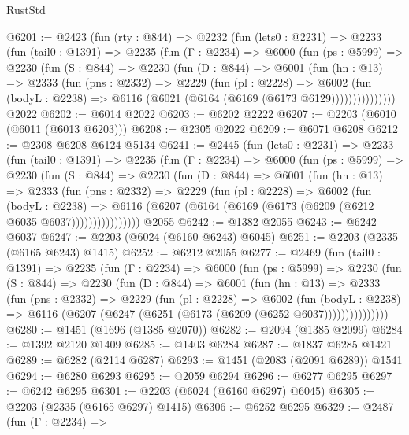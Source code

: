 \begin{lexlean}{RustStd}
\begin{coremodule}
@6201 := @2423
    (fun (rty : @844) =>
    @2232
      (fun (lets0 : @2231) =>
      @2233
        (fun (tail0 : @1391) =>
        @2235
          (fun (Γ : @2234) =>
          @6000
            (fun (ps : @5999) =>
            @2230
              (fun (S : @844) =>
              @2230
                (fun (D : @844) =>
                @6001
                  (fun (hn : @13) =>
                  @2333
                    (fun (pns : @2332) =>
                    @2229
                      (fun (pl : @2228) =>
                      @6002
                        (fun (bodyL : @2238) =>
                        @6116 (@6021 (@6164 (@6169 (@6173 @6129)))))))))))))))
    @2022
@6202 := @6014 @2022
@6203 := @6202 @2222
@6207 := @2203 (@6010 (@6011 (@6013 @6203)))
@6208 := @2305 @2022
@6209 := @6071 @6208
@6212 := @2308 @6208 @6124 @5134
@6241 := @2445
    (fun (lets0 : @2231) =>
    @2233
      (fun (tail0 : @1391) =>
      @2235
        (fun (Γ : @2234) =>
        @6000
          (fun (ps : @5999) =>
          @2230
            (fun (S : @844) =>
            @2230
              (fun (D : @844) =>
              @6001
                (fun (hn : @13) =>
                @2333
                  (fun (pns : @2332) =>
                  @2229
                    (fun (pl : @2228) =>
                    @6002
                      (fun (bodyL : @2238) =>
                      @6116 (@6207 (@6164 (@6169 (@6173 (@6209 (@6212 @6035 @6037))))))))))))))))
    @2055
@6242 := @1382 @2055
@6243 := @6242 @6037
@6247 := @2203 (@6024 (@6160 @6243) @6045)
@6251 := @2203 (@2335 (@6165 @6243) @1415)
@6252 := @6212 @2055
@6277 := @2469
    (fun (tail0 : @1391) =>
    @2235
      (fun (Γ : @2234) =>
      @6000
        (fun (ps : @5999) =>
        @2230
          (fun (S : @844) =>
          @2230
            (fun (D : @844) =>
            @6001
              (fun (hn : @13) =>
              @2333
                (fun (pns : @2332) =>
                @2229
                  (fun (pl : @2228) =>
                  @6002
                    (fun (bodyL : @2238) =>
                    @6116 (@6207 (@6247 (@6251 (@6173 (@6209 (@6252 @6037)))))))))))))))
@6280 := @1451 (@1696 (@1385 @2070))
@6282 := @2094 (@1385 @2099)
@6284 := @1392 @2120 @1409
@6285 := @1403 @6284
@6287 := @1837 @6285 @1421
@6289 := @6282 (@2114 @6287)
@6293 := @1451 (@2083 (@2091 @6289)) @1541
@6294 := @6280 @6293
@6295 := @2059 @6294
@6296 := @6277 @6295
@6297 := @6242 @6295
@6301 := @2203 (@6024 (@6160 @6297) @6045)
@6305 := @2203 (@2335 (@6165 @6297) @1415)
@6306 := @6252 @6295
@6329 := @2487
    (fun (Γ : @2234) =>

\end{coremodule}
\end{lexlean}
